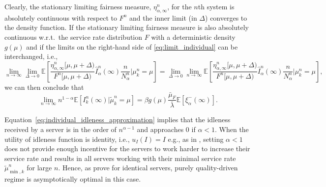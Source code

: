\documentclass[a4paper,11pt,twoside]{article}
\numberwithin{equation}{section}
\numberwithin{figure}{section}
\theoremstyle{plain}
\newcommand{\EE}{\mathbb{E}}
\newcommand{\1}{\mathbbm{1}}
\begin{document}
Clearly, the stationary limiting fairness measure, $\eta_{\alpha,\infty}^n$, for the $n$th system is absolutely continuous with respect to $F^n$ and the inner limit (in $\Delta$) converges to the density function. 
If the stationary limiting fairness measure is also absolutely continuous w.r.t.~the service rate distribution $F$ with  a deterministic density $g(\mu)$ and if the limits on the right-hand side of \eqref{eq:limit_individual} can be interchanged, i.e.,
\begin{equation}
    \lim_{n\to \infty}\lim_{\Delta\to 0}\EE\left[\frac{\eta_{\alpha,\infty}^n[\mu,\mu+\Delta)}{F^n[\mu, \mu+\Delta)}\hat{I}_\alpha^n(\infty)\frac{n}{N_\alpha^n}|\mu_k^n=\mu\right]=\lim_{\Delta\to 0}\lim_{n\to \infty}\EE\left[\frac{\eta_{\alpha,\infty}^n[\mu,\mu+\Delta)}{F^n[\mu, \mu+\Delta)}\hat{I}_\alpha^n(\infty)\frac{n}{N_\alpha^n}|\mu_k^n=\mu\right],
    \label{eq:interchange_limits}
\end{equation}
 we can then conclude that 
\begin{equation}\label{eq:individual_idleness_approximation}
\lim_{n\to\infty} n^{1-\alpha}\EE[I_k^n(\infty)|\tilde{\mu}_k^n=\mu]=\beta g(\mu)\frac{\bar{\mu}_F}{\bar{\lambda}}\EE[\xi_\alpha^{-}(\infty)].
\end{equation}

Equation~\eqref{eq:individual_idleness_approximation} implies that the idleness received by a server is in the order of $n^{\alpha-1}$ and approaches 0 if $\alpha<1$. When the utility of idleness function is identity, i.e., $u_I(I) = I$ e.g., as in \cites{Gopalakrishnan_etal2016, gopalakrishnan2021, armony2021capacity}, setting $\alpha<1$ does not provide enough incentive for the servers to work harder to increase their service rate and results in all servers working with their minimal service rate $\tilde{\mu}_{\min,k}^n$ for large $n$. Hence, as \cite{Gopalakrishnan_etal2016} prove for identical servers, purely quality-driven regime is asymptotically optimal in this case.  
\end{document}
